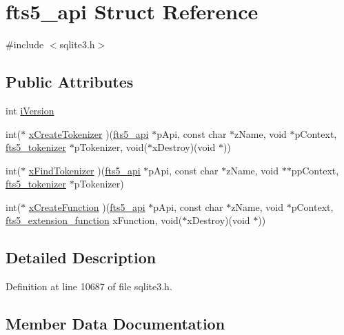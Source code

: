 \hypertarget{structfts5__api}{}\section{fts5\+\_\+api Struct Reference}
\label{structfts5__api}


{\ttfamily \#include $<$sqlite3.\+h$>$}

\subsection*{Public Attributes}
\begin{DoxyCompactItemize}
\item 
int \mbox{\hyperlink{structfts5__api_a3c338289abb33e1805da870172956a7c}{i\+Version}}
\item 
int($\ast$ \mbox{\hyperlink{structfts5__api_a7fe3663f85eab512d5c461e1674da129}{x\+Create\+Tokenizer}} )(\mbox{\hyperlink{structfts5__api}{fts5\+\_\+api}} $\ast$p\+Api, const char $\ast$z\+Name, void $\ast$p\+Context, \mbox{\hyperlink{structfts5__tokenizer}{fts5\+\_\+tokenizer}} $\ast$p\+Tokenizer, void($\ast$x\+Destroy)(void $\ast$))
\item 
int($\ast$ \mbox{\hyperlink{structfts5__api_a20a23794695fa61e2892ad1243b16b67}{x\+Find\+Tokenizer}} )(\mbox{\hyperlink{structfts5__api}{fts5\+\_\+api}} $\ast$p\+Api, const char $\ast$z\+Name, void $\ast$$\ast$pp\+Context, \mbox{\hyperlink{structfts5__tokenizer}{fts5\+\_\+tokenizer}} $\ast$p\+Tokenizer)
\item 
int($\ast$ \mbox{\hyperlink{structfts5__api_acf1a0612be3b91b908f38ecbc6735d17}{x\+Create\+Function}} )(\mbox{\hyperlink{structfts5__api}{fts5\+\_\+api}} $\ast$p\+Api, const char $\ast$z\+Name, void $\ast$p\+Context, \mbox{\hyperlink{sqlite3_8h_a8a1df7b5a066b194f490be5936e85c17}{fts5\+\_\+extension\+\_\+function}} x\+Function, void($\ast$x\+Destroy)(void $\ast$))
\end{DoxyCompactItemize}


\subsection{Detailed Description}


Definition at line 10687 of file sqlite3.\+h.



\subsection{Member Data Documentation}
\mbox{\label{structfts5__api_a3c338289abb33e1805da870172956a7c}} 
